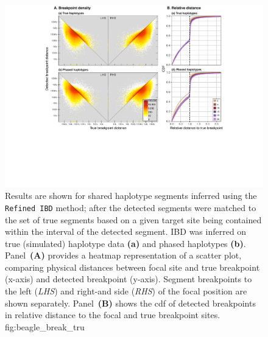 

\begin{figure}[tb]
\includegraphics[width=\textwidth]{./img/ch3/beagle_break_tru_new}
{Results are shown for shared haplotype segments inferred using the \texttt{Refined\,IBD} method; after the detected segments were matched to the set of true segments based on a given target site being contained within the interval of the detected segment.
IBD was inferred on true (simulated) haplotype data \textbf{(a)} and phased haplotypes \textbf{(b)}.
Panel~\textbf{(A)} provides a heatmap representation of a scatter plot, comparing physical distances between focal site and true breakpoint (x-axis) and detected breakpoint (y-axis).
Segment breakpoints to the left (\emph{LHS}) and right-and side (\emph{RHS}) of the focal position are shown separately.
Panel~\textbf{(B)} shows the \gls{cdf} of detected breakpoints in relative distance to the focal and true breakpoint sites.}
{fig:beagle_break_tru}
\end{figure}
